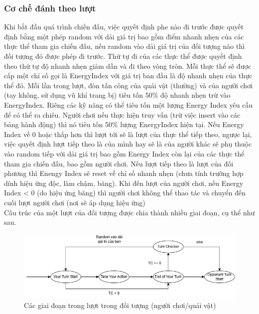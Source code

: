 \subsubsection{Cơ chế đánh theo lượt}
\hspace*{0.5cm} Khi bắt đầu quá trình chiến đấu, việc quyết định phe nào đi trước được quyết định bằng một phép random với dải giá trị bao gồm điểm nhanh nhẹn của các thực thể tham gia chiến đấu, nếu random vào dải giá trị của đối tượng nào thì đối tượng đó được phép đi trước. Thứ tự đi của các thực thể được quyết định theo thứ tự độ nhanh nhẹn giảm dần và đi theo vòng tròn. Mỗi thực thể sẽ được cấp một chỉ số gọi là EnergyIndex với giá trị ban đầu là độ nhanh nhẹn của thực thể đó. Mỗi lần trong lượt, đòn tấn công của quái vật (thường) và của người chơi (tay không, sử dụng vũ khí trang bị) tiêu tốn 50\% độ nhanh nhẹn trừ vào EnergyIndex. Riêng các kỹ năng có thể tiêu tốn một lượng Energy Index yêu cầu để có thể ra chiêu. Người chơi nếu thực hiện truy vấn (trừ việc insert vào các bảng hành động) thì nó tiêu tốn 50\% lượng EnergyIndex hiện tại. Nếu Energy Index về 0 hoặc thấp hơn thì lượt tới sẽ là lượt của thực thể tiếp theo, ngược lại, việc quyết định lượt tiếp theo là của mình hay sẽ là của người khác sẽ phụ thuộc vào random tiếp với dải giá trị bao gồm Energy Index còn lại của các thực thể tham gia chiến đấu, bao gồm người chơi. Nếu lượt tiếp theo là lượt của đối phương thì Enengy Index sẽ reset về chỉ số nhanh nhẹn (chưa tính trường hợp dính hiệu ứng độc, làm chậm, băng). Khi đến lượt của người chơi, nếu Energy Index < 0 (do hiệu ứng băng) thì người chơi không thể thao tác và chuyển đến cuối lượt người chơi (nơi sẽ áp dụng hiệu ứng)\\
\hspace*{0.5cm} Cấu trúc của một lượt của đối tượng được chia thành nhiều giai đoạn, cụ thể như sau. 
\begin{figure}[H]
	\centering	\includegraphics[width=\textwidth]{Images/turnphases.jpg}
	\vspace{0.5cm}
	\caption{Các giai đoạn trong lượt trong đối tượng (người chơi/quái vật)}
\end{figure}
